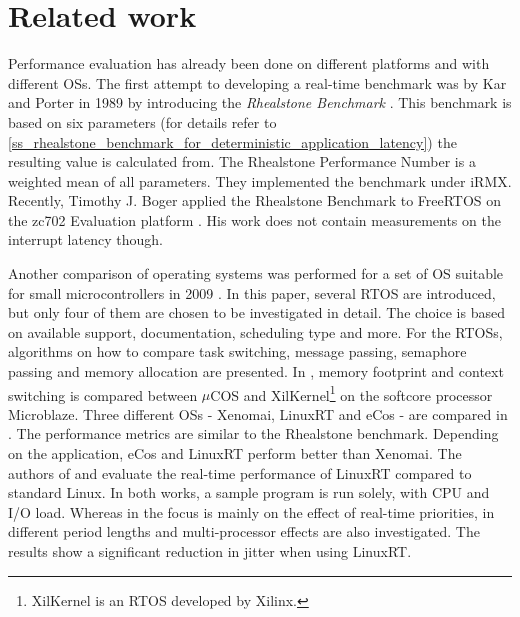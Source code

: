 \section{Related work}
Performance evaluation has already been done on different platforms and with different \acp{OS}. 
The first attempt to developing a real-time benchmark was by Kar and Porter in 1989 by introducing the \textit{Rhealstone Benchmark} \cite{kar:itrb} \cite{kar:artbp}. 
This benchmark is based on six parameters (for details refer to \ref{ss_rhealstone_benchmark_for_deterministic_application_latency}) the resulting value is calculated from.
The Rhealstone Performance Number is a weighted mean of all parameters. 
They implemented the benchmark under iRMX.
Recently, Timothy J. Boger applied the Rhealstone Benchmark to FreeRTOS on the zc702 Evaluation platform \cite{boger:rbofatxzepp}.
His work does not contain measurements on the interrupt latency though.
\par
Another comparison of operating systems was performed for a set of \ac{OS} suitable for small microcontrollers in 2009 \cite{Anh:sapeortosfsm}. 
In this paper, several \ac{RTOS} are introduced, but only four of them are chosen to be investigated in detail.
The choice is based on available support, documentation, scheduling type and more. 
For the \acp{RTOS}, algorithms on how to compare task switching, message passing, semaphore passing and memory allocation are presented.  
In \cite{gokhan:cstamfcoxamom}, memory footprint and context switching is compared between $\mu$COS and XilKernel\footnote{XilKernel \cite{xilinx:xilkernel} is an \ac{RTOS} developed by Xilinx.} on the softcore processor Microblaze.
Three different \acp{OS} - Xenomai, LinuxRT and eCos \cite{ecos} - are compared in \cite{Marieska:opokbaertosbaa}.
The performance metrics are similar to the Rhealstone benchmark.
Depending on the application, eCos and LinuxRT perform better than Xenomai.
The authors of \cite{cereia:peoaemulatrp} and \cite{betz:eeotlrpfrta} evaluate the real-time performance of LinuxRT compared to standard Linux.
In both works, a sample program is run solely, with CPU and I/O load. 
Whereas in \cite{cereia:peoaemulatrp} the focus is mainly on the effect of real-time priorities, in \cite{betz:eeotlrpfrta} different period lengths and multi-processor effects are also investigated. 
The results show a significant reduction in jitter when using LinuxRT.
\par


